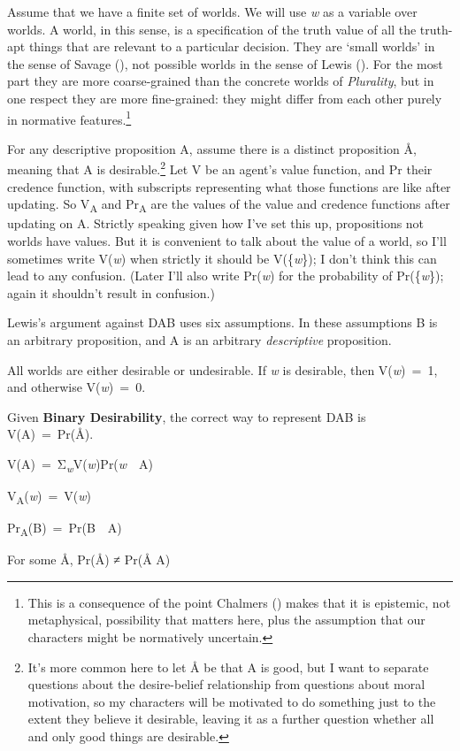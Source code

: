 \documentclass[
  11pt,
  letterpaper,
  DIV=11,
  numbers=noendperiod,
  twoside]{scrartcl}
\providecommand{\tightlist}{%
  \setlength{\itemsep}{0pt}\setlength{\parskip}{0pt}}
\begin{document}
Assume that we have a finite set of worlds. We will use \emph{w} as a
variable over worlds. A world, in this sense, is a specification of the
truth value of all the truth-apt things that are relevant to a
particular decision. They are `small worlds' in the sense of Savage
(), not possible worlds in the sense of
Lewis (). For the most part they are more
coarse-grained than the concrete worlds of \emph{Plurality}, but in one
respect they are more fine-grained: they might differ from each other
purely in normative features.\footnote{This is a consequence of the
  point Chalmers () makes that it is
  epistemic, not metaphysical, possibility that matters here, plus the
  assumption that our characters might be normatively uncertain.}

For any descriptive proposition A, assume there is a distinct
proposition Å, meaning that A is desirable.\footnote{It's more common
  here to let Å be that A is good, but I want to separate questions
  about the desire-belief relationship from questions about moral
  motivation, so my characters will be motivated to do something just to
  the extent they believe it desirable, leaving it as a further question
  whether all and only good things are desirable.} Let V be an agent's
value function, and Pr their credence function, with subscripts
representing what those functions are like after updating. So
V\textsubscript{A} and Pr\textsubscript{A} are the values of the value
and credence functions after updating on A. Strictly speaking given how
I've set this up, propositions not worlds have values. But it is
convenient to talk about the value of a world, so I'll sometimes write
V(\emph{w}) when strictly it should be V(\{\emph{w}\}); I don't think
this can lead to any confusion. (Later I'll also write Pr(\emph{w}) for
the probability of Pr(\{\emph{w}\}); again it shouldn't result in
confusion.)

Lewis's argument against DAB uses six assumptions. In these assumptions
B is an arbitrary proposition, and A is an arbitrary \emph{descriptive}
proposition.

\begin{description}
\tightlist
\item[Binary Desirability]
All worlds are either desirable or undesirable. If \emph{w} is
desirable, then V(\emph{w})~=~1, and otherwise V(\emph{w})~=~0.
\item[Equation]
Given \textbf{Binary Desirability}, the correct way to represent DAB is
V(A)~=~Pr(Å).
\item[Additivity]
V(A)~=~Σ\textsubscript{\emph{w}}V(\emph{w})Pr(\emph{w}~\textbar~A)
\item[Worldly Invariance]
V\textsubscript{A}(\emph{w})~=~V(\emph{w})
\item[Restricted Conditionalisation]
Pr\textsubscript{A}(B)~=~Pr(B~\textbar~A)
\item[Possible Independence]
For some Å, Pr(Å) ≠ Pr(Å \textbar{} A)
\end{description}
\end{document}
